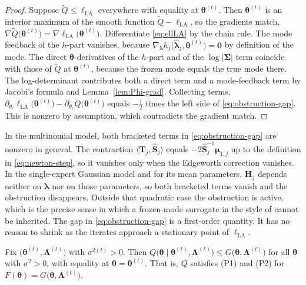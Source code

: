 \begin{proof}
Suppose $\tilde{Q}\leq\ell_{\text{LA}}$ everywhere with equality at $\bm{\theta}^{(t)}$. Then $\bm{\theta}^{(t)}$ is an interior maximum of the smooth function $\tilde{Q}-\ell_{\text{LA}}$, so the gradients match, $\nabla\tilde{Q}\big(\bm{\theta}^{(t)}\big)=\nabla\ell_{\text{LA}}\big(\bm{\theta}^{(t)}\big)$. Differentiate \eqref{eq:ellLA} by the chain rule. The mode feedback of the $h$-part vanishes, because $\nabla_{\bm{\lambda}}h_{j}\big(\hat{\bm{\lambda}}_{j},\bm{\theta}^{(t)}\big)=\bm{0}$ by definition of the mode. The direct $\bm{\theta}$-derivatives of the $h$-part and of the $\log|\bm{\Sigma}|$ term coincide with those of $\tilde{Q}$ at $\bm{\theta}^{(t)}$, because the frozen mode equals the true mode there. The log-determinant contributes both a direct term and a mode-feedback term by Jacobi's formula and Lemma~\ref{lem:Phi-grad}. Collecting terms, $\partial_{\theta_{r}}\ell_{\text{LA}}\big(\bm{\theta}^{(t)}\big)-\partial_{\theta_{r}}\tilde{Q}\big(\bm{\theta}^{(t)}\big)$ equals $-\frac{1}{2}$ times the left side of \eqref{eq:obstruction-gap}. This is nonzero by assumption, which contradicts the gradient match.
\end{proof}

In the multinomial model, both bracketed terms in \eqref{eq:obstruction-gap} are nonzero in general. The contraction $\big\langle\mathbf{T}_{j},\hat{\mathbf{S}}_{j}\big\rangle$ equals $-2\hat{\mathbf{S}}_{j}^{-1}\bm{\mu}_{1,j}$ up to the definition in \eqref{eq:newton-step}, so it vanishes only when the Edgeworth correction vanishes. In the single-expert Gaussian model and for its mean parameters, $\mathbf{H}_{j}$ depends neither on $\bm{\lambda}$ nor on those parameters, so both bracketed terms vanish and the obstruction disappears. Outside that quadratic case the obstruction is active, which is the precise sense in which a frozen-mode surrogate in the style of \citet{Yue2026} cannot be inherited. The gap in \eqref{eq:obstruction-gap} is a first-order quantity. It has no reason to shrink as the iterates approach a stationary point of $\ell_{\text{LA}}$.

\begin{proposition}
Fix $\big(\bm{\theta}^{(t)},\bm{\Lambda}^{(t)}\big)$ with $\sigma^{2(t)}>0$. Then $Q\big(\bm{\theta}\mid\bm{\theta}^{(t)},\bm{\Lambda}^{(t)}\big)\leq G\big(\bm{\theta},\bm{\Lambda}^{(t)}\big)$ for all $\bm{\theta}$ with $\sigma^{2}>0$, with equality at $\bm{\theta}=\bm{\theta}^{(t)}$. That is, $Q$ satisfies (P1) and (P2) for $F(\bm{\theta})=G\big(\bm{\theta},\bm{\Lambda}^{(t)}\big)$.
\label{prop:Q-minorize}
\end{proposition}

